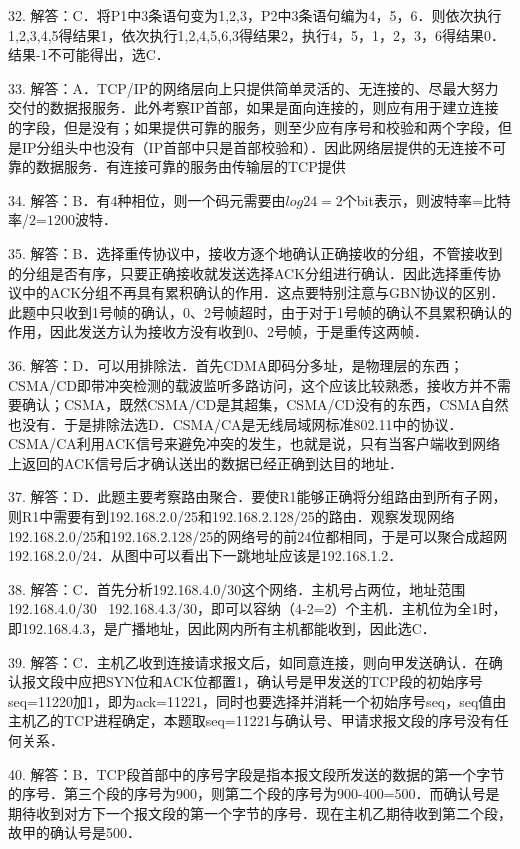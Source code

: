 32. 解答：C．将P1中3条语句变为1,2,3，P2中3条语句编为4，5，6．则依次执行1,2,3,4,5得结果1，依次执行1,2,4,5,6,3得结果2，执行4，5，1，2，3，6得结果0．结果-1不可能得出，选C．

33. 解答：A．TCP/IP的网络层向上只提供简单灵活的、无连接的、尽最大努力交付的数据报服务．此外考察IP首部，如果是面向连接的，则应有用于建立连接的字段，但是没有；如果提供可靠的服务，则至少应有序号和校验和两个字段，但是IP分组头中也没有（IP首部中只是首部校验和）．因此网络层提供的无连接不可靠的数据服务．有连接可靠的服务由传输层的TCP提供

34. 解答：B．有$4$种相位，则一个码元需要由$log24=2$个bit表示，则波特率=比特率/$2$=$1200$波特．

35. 解答：B．选择重传协议中，接收方逐个地确认正确接收的分组，不管接收到的分组是否有序，只要正确接收就发送选择ACK分组进行确认．因此选择重传协议中的ACK分组不再具有累积确认的作用．这点要特别注意与GBN协议的区别．此题中只收到1号帧的确认，0、2号帧超时，由于对于1号帧的确认不具累积确认的作用，因此发送方认为接收方没有收到0、2号帧，于是重传这两帧．

36. 解答：D．可以用排除法．首先CDMA即码分多址，是物理层的东西；CSMA/CD即带冲突检测的载波监听多路访问，这个应该比较熟悉，接收方并不需要确认；CSMA，既然CSMA/CD是其超集，CSMA/CD没有的东西，CSMA自然也没有．于是排除法选D．CSMA/CA是无线局域网标准802.11中的协议．CSMA/CA利用ACK信号来避免冲突的发生，也就是说，只有当客户端收到网络上返回的ACK信号后才确认送出的数据已经正确到达目的地址．

37. 解答：D．此题主要考察路由聚合．要使R1能够正确将分组路由到所有子网，则R1中需要有到192.168.2.0/25和192.168.2.128/25的路由．观察发现网络192.168.2.0/25和192.168.2.128/25的网络号的前24位都相同，于是可以聚合成超网192.168.2.0/24．从图中可以看出下一跳地址应该是192.168.1.2．

38. 解答：C．首先分析192.168.4.0/30这个网络．主机号占两位，地址范围192.168.4.0/30~ 192.168.4.3/30，即可以容纳（4-2=2）个主机．主机位为全1时，即192.168.4.3，是广播地址，因此网内所有主机都能收到，因此选C．

39. 解答：C．主机乙收到连接请求报文后，如同意连接，则向甲发送确认．在确认报文段中应把SYN位和ACK位都置1，确认号是甲发送的TCP段的初始序号seq=11220加1，即为ack=11221，同时也要选择并消耗一个初始序号seq，seq值由主机乙的TCP进程确定，本题取seq=11221与确认号、甲请求报文段的序号没有任何关系．

40. 解答：B．TCP段首部中的序号字段是指本报文段所发送的数据的第一个字节的序号．第三个段的序号为900，则第二个段的序号为900-400=500．而确认号是期待收到对方下一个报文段的第一个字节的序号．现在主机乙期待收到第二个段，故甲的确认号是500．


